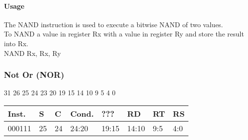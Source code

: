 \documentclass[12pt]{article}
\begin{document}
    \paragraph{Usage}
    \begin{flushleft}
    The NAND instruction is used to execute a bitwise NAND of two values.\\
    \vspace{1em}
    To NAND a value in register Rx with a value in register Ry and store the result into Rx.\\
    \vspace{1em}
    NAND Rx, Rx, Ry
    \end{flushleft}
   
   




    \newpage
    \subsubsection{Not Or (NOR)}
    
    \hspace{1.6cm}31 \hspace{1.2cm}26 \hspace{.075cm}25 \hspace{.15cm}24 \hspace{.075cm}23 \hspace{.875cm}20 \hspace{.04cm}19 \hspace{.8cm}15 \hspace{.04cm}14 \hspace{.8cm}10 \hspace{.04cm}9 \hspace{1.15cm}5 \hspace{.04cm}4 \hspace{1.25cm}0
    \vspace{-.25cm}
    \begin{center}
        \begin{tabular}{ |p{1.8cm}|p{.3cm}|p{.3cm}|p{1.5cm}|p{1.5cm}|p{1.5cm}|p{1.5cm}|p{1.5cm}| }
            \hline
            \textbf{Inst.} & \textbf{S}& \textbf{C} & \textbf{Cond.} & ??? & \textbf{RD} & \textbf{RT} & \textbf{RS}\\
            \hline
            000111& 25 & 24 & 24:20 & 19:15 & 14:10 & 9:5 & 4:0\\
            \hline
        \end{tabular}
    \end{center}
    
\end{document}
